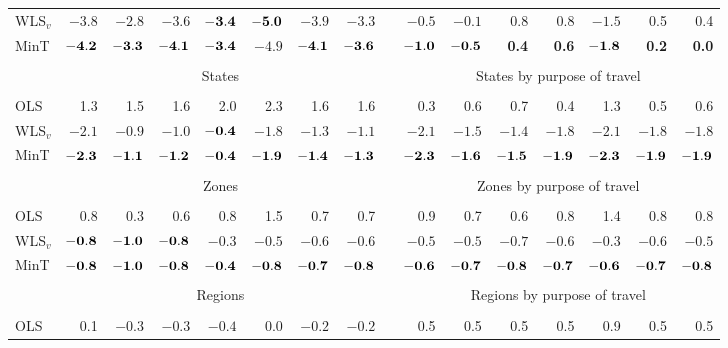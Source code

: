 \documentclass[10pt,a4paper]{article}
\begin{document}
\begin{enumerate}
\begin{table*}[!htb]
\begin{threeparttable}
\begin{tabular}{lrrrrrrrrrrrrrrr}
  WLS$_v$ & $-3.8$ & $-2.8$ & $-3.6$ & $\bf{ -3.4}$ & $\bf{ -5.0}$ & $-3.9$ & $-3.3$ & & $-0.5$ & $-0.1$ & 0.8 & 0.8 & $-1.5$ & 0.5 & 0.4 \\
  MinT & $\bf{ -4.2}$ & $\bf{ -3.3}$ & $\bf{ -4.1}$ & $\bf{ -3.4}$ & $-4.9$ & $\bf{ -4.1}$ & $\bf{ -3.6}$ & & $\bf{ -1.0}$ & $\bf{ -0.5}$ & \bf{ 0.4} & \bf{ 0.6} & $\bf{ -1.8}$ & \bf{ 0.2} & \bf{ 0.0} \\
  \cline{2-8}\cline{10-16} \\[-0.3cm]
  & \multicolumn{7}{c}{States} & & \multicolumn{7}{c}{States by purpose of travel} \\
  \cline{2-8}\cline{10-16} \\[-0.3cm]
  OLS & 1.3 & 1.5 & 1.6 & 2.0 & 2.3 & 1.6 & 1.6 & & 0.3 & 0.6 & 0.7 & 0.4 & 1.3 & 0.5 & 0.6 \\
  WLS$_v$ & $-2.1$ & $-0.9$ & $-1.0$ & $\bf{ -0.4}$ & $-1.8$ & $-1.3$ & $-1.1$ & & $-2.1$ & $-1.5$ & $-1.4$ & $-1.8$ & $-2.1$ & $-1.8$ & $-1.8$ \\
  MinT & $\bf{ -2.3}$ & $\bf{ -1.1}$ & $\bf{ -1.2}$ & $\bf{ -0.4}$ & $\bf{ -1.9}$ & $\bf{ -1.4}$ & $\bf{ -1.3}$ & & $\bf{ -2.3}$ & $\bf{ -1.6}$ & $\bf{ -1.5}$ & $\bf{ -1.9}$ & $\bf{ -2.3}$ & $\bf{ -1.9}$ & $\bf{ -1.9}$ \\
  \cline{2-8}\cline{10-16} \\[-0.3cm]
  & \multicolumn{7}{c}{Zones} & & \multicolumn{7}{c}{Zones by purpose of travel} \\
  \cline{2-8}\cline{10-16} \\[-0.3cm]
  OLS & 0.8 & 0.3 & 0.6 & 0.8 & 1.5 & 0.7 & 0.7 & & 0.9 & 0.7 & 0.6 & 0.8 & 1.4 & 0.8 & 0.8 \\
  WLS$_v$ & $\bf{ -0.8}$ & $\bf{ -1.0}$ & $\bf{ -0.8}$ & $-0.3$ & $-0.5$ & $-0.6$ & $-0.6$ & & $-0.5$ & $-0.5$ & $-0.7$ & $-0.6$ & $-0.3$ & $-0.6$ & $-0.5$ \\
  MinT & $\bf{ -0.8}$ & $\bf{ -1.0}$ & $\bf{ -0.8}$ & $\bf{ -0.4}$ & $\bf{ -0.8}$ & $\bf{ -0.7}$ & $\bf{ -0.8}$ & & $\bf{ -0.6}$ & $\bf{ -0.7}$ & $\bf{ -0.8}$ & $\bf{ -0.7}$ & $\bf{ -0.6}$ & $\bf{ -0.7}$ & $\bf{ -0.8}$ \\
  \cline{2-8}\cline{10-16} \\[-0.3cm]
  & \multicolumn{7}{c}{Regions} & & \multicolumn{7}{c}{Regions by purpose of travel} \\
  \cline{2-8}\cline{10-16} \\[-0.3cm]
  OLS & 0.1 & $-0.3$ & $-0.3$ & $-0.4$ & 0.0 & $-0.2$ & $-0.2$ & & 0.5 & 0.5 & 0.5 & 0.5 & 0.9 & 0.5 & 0.5\\

\end{tabular}
\end{threeparttable}
\end{table*}
\end{enumerate}
\end{document}
